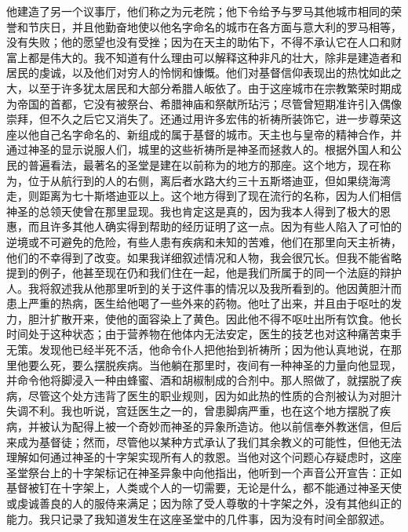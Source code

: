 他建造了另一个议事厅，他们称之为元老院；他下令给予与罗马其他城市相同的荣誉和节庆日，并且他勤奋地使以他名字命名的城市在各方面与意大利的罗马相等，没有失败；他的愿望也没有受挫；因为在天主的助佑下，不得不承认它在人口和财富上都是伟大的。我不知道有什么理由可以解释这种非凡的壮大，除非是建造者和居民的虔诚，以及他们对穷人的怜悯和慷慨。他们对基督信仰表现出的热忱如此之大，以至于许多犹太居民和大部分希腊人皈依了。由于这座城市在宗教繁荣时期成为帝国的首都，它没有被祭台、希腊神庙和祭献所玷污；尽管曾短期准许引入偶像崇拜，但不久之后它又消失了。还通过用许多宏伟的祈祷所装饰它，进一步尊荣这座以他自己名字命名的、新组成的属于基督的城市。天主也与皇帝的精神合作，并通过神圣的显示说服人们，城里的这些祈祷所是神圣而拯救人的。根据外国人和公民的普遍看法，最著名的圣堂是建在以前称为的地方的那座。这个地方，现在称为，位于从航行到的人的右侧，离后者水路大约三十五斯塔迪亚，但如果绕海湾走，则距离为七十斯塔迪亚以上。这个地方得到了现在流行的名称，因为人们相信神圣的总领天使曾在那里显现。我也肯定这是真的，因为我本人得到了极大的恩惠，而且许多其他人确实得到帮助的经历证明了这一点。因为有些人陷入了可怕的逆境或不可避免的危险，有些人患有疾病和未知的苦难，他们在那里向天主祈祷，他们的不幸得到了改变。如果我详细叙述情况和人物，我会很冗长。但我不能省略提到的例子，他甚至现在仍和我们住在一起，他是我们所属于的同一个法庭的辩护人。我将叙述我从他那里听到的关于这件事的情况以及我所看到的。他因黄胆汁而患上严重的热病，医生给他喝了一些外来的药物。他吐了出来，并且由于呕吐的发力，胆汁扩散开来，使他的面容染上了黄色。因此他不得不呕吐出所有饮食。他长时间处于这种状态；由于营养物在他体内无法安定，医生的技艺也对这种痛苦束手无策。发现他已经半死不活，他命令仆人把他抬到祈祷所；因为他认真地说，在那里他要么死，要么摆脱疾病。当他躺在那里时，夜间有一种神圣的力量向他显现，并命令他将脚浸入一种由蜂蜜、酒和胡椒制成的合剂中。那人照做了，就摆脱了疾病，尽管这个处方违背了医生的职业规则，因为如此热的性质的合剂被认为对胆汁失调不利。我也听说，宫廷医生之一的，曾患脚病严重，也在这个地方摆脱了疾病，并被认为配得上被一个奇妙而神圣的异象所造访。他以前信奉外教迷信，但后来成为基督徒；然而，尽管他以某种方式承认了我们其余教义的可能性，但他无法理解如何通过神圣的十字架实现所有人的救恩。当他对这个问题心存疑虑时，这座圣堂祭台上的十字架标记在神圣异象中向他指出，他听到一个声音公开宣告：正如基督被钉在十字架上，人类或个人的一切需要，无论是什么，都不能通过神圣天使或虔诚善良的人的服侍来满足；因为除了受人尊敬的十字架之外，没有其他纠正的能力。我只记录了我知道发生在这座圣堂中的几件事，因为没有时间全部叙述。\par

